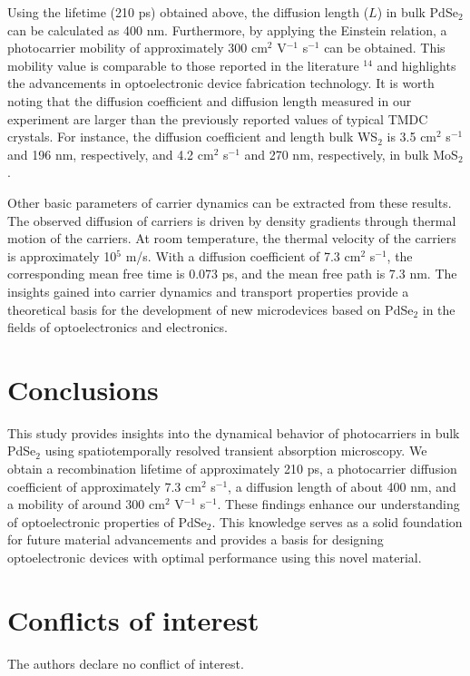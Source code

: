 \documentclass[twoside,twocolumn,9pt]{article}
\begin{document}
Using the lifetime (210 ps) obtained above, the diffusion length ($L$) in bulk PdSe$_2$ can be calculated as 400 nm. Furthermore, by applying the Einstein relation, a photocarrier mobility of approximately 300 cm$^{2}$ V$^{-1}$ s$^{-1}$ can be obtained. This mobility value is comparable to those reported in the literature $^{14}$ and highlights the advancements in optoelectronic device fabrication technology. It is worth noting that the diffusion coefficient and diffusion length measured in our experiment are larger than the previously reported values of typical TMDC crystals. For instance, the diffusion coefficient and length bulk WS$_2$ is 3.5 cm$^{2}$ s$^{-1}$ and 196 nm, respectively,\cite{he2015spatiotemporal} and 4.2 cm$^{2}$ s$^{-1}$ and 270 nm, respectively, in bulk MoS$_2$.\cite{kumar2013charge}








Other basic parameters of carrier dynamics can be extracted from these results. The observed diffusion of carriers is driven by density gradients through thermal motion of the carriers. At room temperature, the thermal velocity of the carriers is approximately 10$^{5}$ m/s. With a diffusion coefficient of 7.3 cm$^{2}$ s$^{-1}$, the corresponding mean free time is 0.073 ps, and the mean free path is 7.3 nm. The insights gained into carrier dynamics and transport properties provide a theoretical basis for the development of new microdevices based on PdSe$_2$ in the fields of optoelectronics and electronics.

\section{Conclusions}
This study provides insights into the dynamical behavior of photocarriers in bulk PdSe$_2$ using spatiotemporally resolved transient absorption microscopy. We obtain a recombination lifetime of approximately 210 ps, a photocarrier diffusion coefficient of approximately 7.3 cm$^{2}$ s$^{-1}$, a diffusion length of about 400 nm, and a mobility of around 300 cm$^{2}$ V$^{-1}$ s$^{-1}$. These findings enhance our understanding of optoelectronic properties of PdSe$_2$. This knowledge serves as a solid foundation for future material advancements and provides a basis for designing optoelectronic devices with optimal performance using this novel material.


\section*{Conflicts of interest}
The authors declare no conflict of interest.
\end{document}
